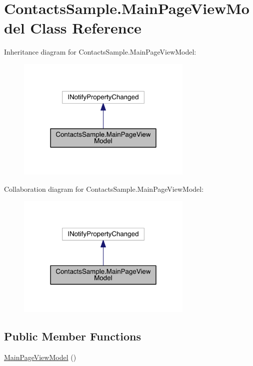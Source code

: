 \hypertarget{class_contacts_sample_1_1_main_page_view_model}{\section{Contacts\+Sample.\+Main\+Page\+View\+Model Class Reference}
\label{class_contacts_sample_1_1_main_page_view_model}
}


Inheritance diagram for Contacts\+Sample.\+Main\+Page\+View\+Model\+:
\nopagebreak
\begin{figure}[H]
\begin{center}
\leavevmode
\includegraphics[width=238pt]{class_contacts_sample_1_1_main_page_view_model__inherit__graph}
\end{center}
\end{figure}


Collaboration diagram for Contacts\+Sample.\+Main\+Page\+View\+Model\+:
\nopagebreak
\begin{figure}[H]
\begin{center}
\leavevmode
\includegraphics[width=238pt]{class_contacts_sample_1_1_main_page_view_model__coll__graph}
\end{center}
\end{figure}
\subsection*{Public Member Functions}
\begin{DoxyCompactItemize}
\item 
\hyperlink{class_contacts_sample_1_1_main_page_view_model_a4a5e070f05f093ca39bfc16552b271fe}{Main\+Page\+View\+Model} ()
\end{DoxyCompactItemize}

